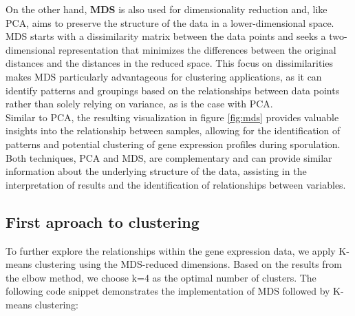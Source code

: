 \documentclass{article}
\begin{document}
On the other hand, \textbf{MDS} is also used for dimensionality reduction and, like PCA, aims to preserve the structure of the data in a lower-dimensional space. MDS starts with a dissimilarity matrix between the data points and seeks a two-dimensional representation that minimizes the differences between the original distances and the distances in the reduced space. This focus on dissimilarities makes MDS particularly advantageous for clustering applications, as it can identify patterns and groupings based on the relationships between data points rather than solely relying on variance, as is the case with PCA.
\\

Similar to PCA, the resulting visualization in figure \ref{fig:mds} provides valuable insights into the relationship between samples, allowing for the identification of patterns and potential clustering of gene expression profiles during sporulation. Both techniques, PCA and MDS, are complementary and can provide similar information about the underlying structure of the data, assisting in the interpretation of results and the identification of relationships between variables.

\subsection{First aproach to clustering}

To further explore the relationships within the gene expression data, we apply K-means clustering using the MDS-reduced dimensions. Based on the results from the elbow method, we choose k=4 as the optimal number of clusters. The following code snippet demonstrates the implementation of MDS followed by K-means clustering:
\end{document}
